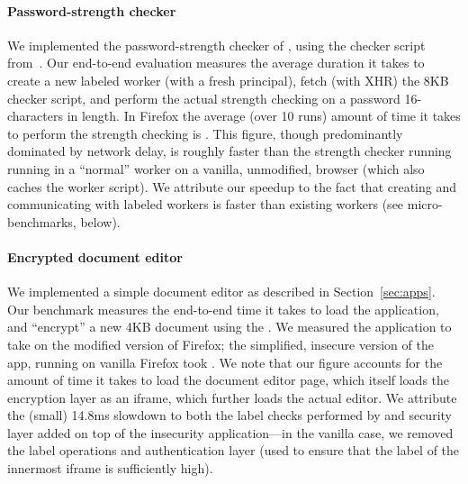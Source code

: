 \paragraph{Password-strength checker}
%
We implemented the password-strength checker of
, using the checker script
from~\cite{checker1}.
%
Our end-to-end evaluation measures the average duration it takes to
create a new labeled worker (with a fresh principal), fetch (with XHR)
the 8KB checker script, and perform the actual strength
checking on a password 16-characters in length.
%
%
In Firefox the average (over 10 runs) amount of time it takes to
perform the strength checking is .
%
This figure, though predominantly dominated by network delay, is
roughly  faster than the strength checker running running in a
``normal'' worker on a vanilla, unmodified, browser (which
also caches the worker script).
%
We attribute our speedup to the fact that creating and communicating
with labeled workers is faster than existing workers (see
micro-benchmarks, below).
%


\paragraph{Encrypted document editor}

We implemented a simple document editor as described in
Section~\ref{sec:apps}.
%
Our benchmark measures the end-to-end time it takes to load the
application, and ``encrypt'' a new 4KB document using
the .
%
We measured the \sys{} application to take  on the modified
version of Firefox; the simplified, insecure version of the app,
running on vanilla Firefox took .
%
We note that our figure accounts for the amount of time it takes to
load the document editor page, which itself loads the encryption layer
as an iframe, which further loads the actual editor.
%
We attribute the (small) 14.8ms slowdown to both the label checks
performed by \sys{} and security layer added on top of the insecurity
application---in the vanilla case, we removed the label operations and
authentication layer (used to ensure that the label of the innermost
iframe is sufficiently high).
%


